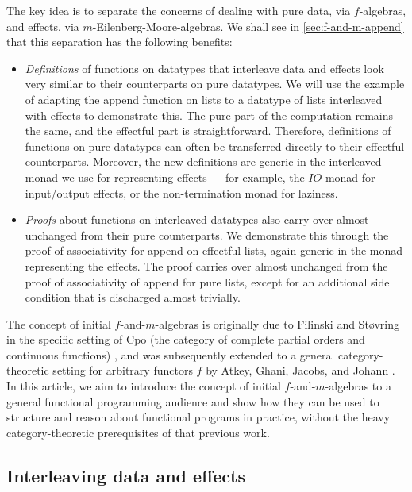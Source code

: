 \documentclass{jfp1}
\begin{document}
The key idea is to separate the concerns of dealing with pure data,
via $f$-algebras, and effects, via $m$-Eilenberg-Moore-algebras. We
shall see in \autoref{sec:f-and-m-append} that this separation has the
following benefits:
\begin{itemize}
\item \emph{Definitions} of functions on datatypes that interleave
  data and effects look very similar to their counterparts on pure
  datatypes. We will use the example of adapting the append function
  on lists to a datatype of lists interleaved with effects to
  demonstrate this. The pure part of the computation remains the same,
  and the effectful part is straightforward. Therefore, definitions of
  functions on pure datatypes can often be transferred directly to
  their effectful counterparts. Moreover, the new definitions are
  generic in the interleaved monad we use for representing effects ---
  for example, the $\mathit{IO}$ monad for input/output effects, or
  the non-termination monad for laziness.
\item \emph{Proofs} about functions on interleaved datatypes also
  carry over almost unchanged from their pure counterparts. We
  demonstrate this through the proof of associativity for append on
  effectful lists, again generic in the monad representing the
  effects. The proof carries over almost unchanged from the proof of
  associativity of append for pure lists, except for an additional
  side condition that is discharged almost trivially.
\end{itemize}


The concept of initial $f$-and-$m$-algebras is originally due to
Filinski and St\o{}vring in the specific setting of Cpo (the category
of complete partial orders and continuous functions)
\cite{filinski07inductive}, and was subsequently extended to a general
category-theoretic setting for arbitrary functors $f$ by Atkey, Ghani,
Jacobs, and Johann \cite{atkey12fibrational}.  In this article, we aim
to introduce the concept of initial $f$-and-$m$-algebras to a general
functional programming audience and show how they can be used to
structure and reason about functional programs in practice, without
the heavy category-theoretic prerequisites of that previous work.

\subsection{Interleaving data and effects}
\label{sec:motivate-interleaving}
\end{document}
